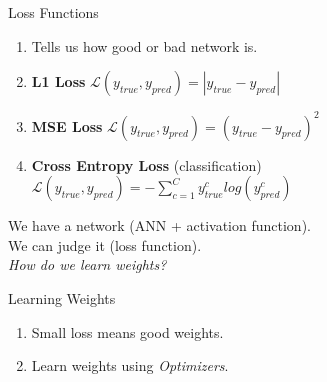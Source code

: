 \documentclass[handout]{beamer}
\begin{document}
\begin{frame}{Loss Functions}
\begin{enumerate}
  \item Tells us how good or bad network is. \\

  \item \textbf{L1 Loss} $\mathcal{L}(y_{true},y_{pred}) = |y_{true}-y_{pred}|$ \\

  \item \textbf{MSE Loss} $\mathcal{L}(y_{true},y_{pred}) = (y_{true}-y_{pred})^2$ \\

  \item \textbf{Cross Entropy Loss} (classification) $\mathcal{L}(y_{true},y_{pred}) = -\sum_{c=1}^{C}y^c_{true}log(y^c_{pred})$ \\
\end{enumerate}
\end{frame}

\begin{frame}{}
    \center
    \Large{\color{blue}We have a network (ANN + activation function). \\
    We can judge it (loss function). \\
    \textit{How do we learn weights?}}
\end{frame}

\begin{frame}{Learning Weights}
  \begin{enumerate}
    \item Small loss means good weights.
    \item Learn weights using \textit{Optimizers}.
  \end{enumerate}
\end{frame}

\end{document}
